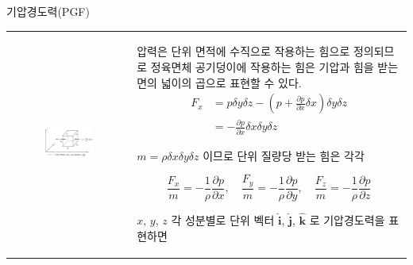 \begin{frame}[t]{기압경도력(PGF)}
	\begin{tabular}{ll}
		\begin{minipage}[t]{0.45\textwidth}\scriptsize
			\begin{figure}[t]
				\includegraphics[width=\textwidth]{./images/PGF1}
			\end{figure}
			
		\end{minipage}	
		&
		\begin{minipage}[t]{0.5\textwidth} \scriptsize	
		압력은 단위 면적에 수직으로 작용하는 힘으로 정의되므로 정육면체 공기덩이에 작용하는 힘은 기압과 힘을 받는 면의 넓이의 곱으로 표현할 수 있다. 
			$${\displaystyle	{
					\begin{aligned}
						F_{x}&=p \delta y \delta z-\left(p+\frac{\partial p}{\partial x} \delta x\right) \delta y \delta z\\
						&=-\frac{\partial p}{\partial x} \delta x \delta y \delta z
					\end{aligned}
			}	} $$
		
				$m = \rho \delta x \delta y \delta z $ 이므로 단위 질량당 받는 힘은 각각

			$${\displaystyle	{
					\frac{F_{x}}{m} =-\frac{1}{\rho} \frac{\partial p}{\partial x}, \quad 
					\frac{F_{y}}{m} =-\frac{1}{\rho} \frac{\partial p}{\partial y}, \quad 
					\frac{F_{z}}{m} =-\frac{1}{\rho} \frac{\partial p}{\partial z} 
			}	}	$$

			$x$, $y$,  $z$ 각 성분별로 단위 벡터 $\boldsymbol{\hat{i}}$,  $\boldsymbol{\hat{j}}$, $\boldsymbol{\hat{k}}$	로 기압경도력을 표현하면

		\end{minipage}
	\end{tabular}
\end{frame}



